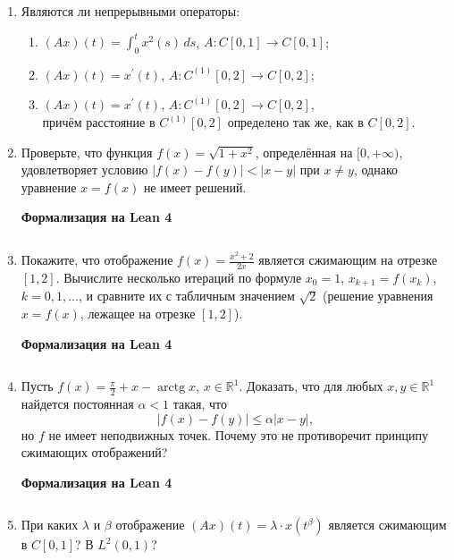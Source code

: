 \documentclass[12pt,a4paper]{article}
\begin{document}
\begin{enumerate}
\item Являются ли непрерывными операторы:
\begin{enumerate}[label=\alph*)]
\item $(Ax)(t)=\int_{0}^{t}x^{2}(s) \, ds$, $A:C[0,1]\rightarrow C[0,1]$;
\item $(Ax)(t)=x^{\prime}(t)$, $A:C^{(1)}[0,2]\rightarrow C[0,2]$;
\item $(Ax)(t)=x^{\prime}(t)$, $A:C^{(1)}[0,2]\rightarrow C[0,2]$, \\ причём расстояние в $C^{(1)}[0,2]$ определено так же, как в $C[0,2]$.
\end{enumerate}

\newpage
\item Проверьте, что функция $f(x)=\sqrt{1+x^{2}}$, определённая на $[0, +\infty)$, удовлетворяет условию $|f(x)-f(y)|<|x-y|$ при $x\ne y$, однако уравнение $x=f(x)$ не имеет решений.


\begin{center}\small\textbf{Формализация на Lean 4}\end{center}
\inputminted{lean}{FunAn/Section10_Contraction/Task02.lean}

\newpage
\item Покажите, что отображение $f(x)=\frac{x^{2}+2}{2x}$ является сжимающим на отрезке $[1, 2]$. Вычислите несколько итераций по формуле $x_{0}=1$, $x_{k+1}=f(x_{k})$, $k=0,1,\dots$, и сравните их с табличным значением $\sqrt{2}$ (решение уравнения $x=f(x)$, лежащее на отрезке $[1,2]$).


\begin{center}\small\textbf{Формализация на Lean 4}\end{center}
\inputminted{lean}{FunAn/Section10_Contraction/Task03.lean}

\newpage
\item Пусть $f(x)=\frac{\pi}{2}+x-\operatorname{arctg} x$, $x\in\mathbb{R}^{1}$. Доказать, что для любых $x, y\in\mathbb{R}^{1}$ найдется постоянная $\alpha<1$ такая, что
$$|f(x)-f(y)|\le\alpha|x-y|,$$
но $f$ не имеет неподвижных точек. Почему это не противоречит принципу сжимающих отображений?


\begin{center}\small\textbf{Формализация на Lean 4}\end{center}
\inputminted{lean}{FunAn/Section10_Contraction/Task04.lean}

\newpage

\item При каких $\lambda$ и $\beta$ отображение $(Ax)(t)=\lambda\cdot x(t^{\beta})$ является сжимающим в $C[0,1]$? В $L^{2}(0,1)$?


\end{enumerate}
\end{document}
